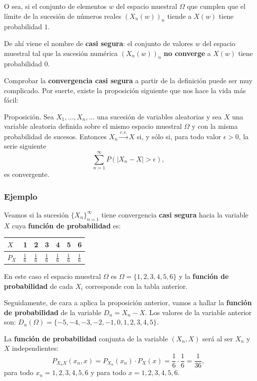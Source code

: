 \documentclass[]{book}
\begin{document}
O sea, si el conjunto de elementos \(w\) del espacio muestral \(\Omega\) que cumplen que el límite de la sucesión de números reales \((X_n(w))_n\) tiende a \(X(w)\) tiene probabilidad \(1\).

De ahí viene el nombre de \textbf{casi segura}: el conjunto de valores \(w\) del espacio muestral tal que la sucesión numérica \((X_n(w))_n\) \textbf{no converge} a \(X(w)\) tiene probabilidad 0.

Comprobar la \textbf{convergencia casi segura} a partir de la definición puede ser muy complicado. Por suerte, existe la proposición siguiente que nos hace la vida más fácil:

 Proposición.
Sea \(X_1,\ldots,X_n,\ldots\) una sucesión de variables aleatorias y sea \(X\) una variable aleatoria definida sobre el mismo espacio muestral \(\Omega\) y con la misma probabilidad de sucesos.
Entonces \(X_n\stackrel{c.s.}{\longrightarrow}X\) si, y sólo si, para todo valor \(\epsilon >0\), la serie siguiente
\[
\sum_{n=1}^\infty P(|X_n-X|>\epsilon),
\]
es convergente.

\hypertarget{ejemplo-2}{%
\subsubsection{Ejemplo}\label{ejemplo-2}}

Veamos si la sucesión \(\{X_n\}_{n=1}^\infty\) tiene convergencia \textbf{casi segura} hacia la variable \(X\) cuya \textbf{función de probabilidad} es:

\begin{longtable}[]{@{}lllllll@{}}
\toprule
\(X\) & 1 & 2 & 3 & 4 & 5 & 6\tabularnewline
\midrule
\endhead
\(P_X\) & \(\frac{1}{6}\) & \(\frac{1}{6}\) & \(\frac{1}{6}\) & \(\frac{1}{6}\) & \(\frac{1}{6}\) & \(\frac{1}{6}\)\tabularnewline
\bottomrule
\end{longtable}

En este caso el espacio muestral \(\Omega\) es \(\Omega=\{1,2,3,4,5,6\}\) y la \textbf{función de probabilidad} de cada \(X_i\) corresponde con la tabla anterior.

Seguidamente, de cara a aplica la proposición anterior, vamos a hallar la \textbf{función de probabilidad} de la variable \(D_n=X_n-X\).
Los valores de la variable anterior son: \(D_n(\Omega)=\{-5,-4,-3,-2,-1,0,1,2,3,4,5\}\).

La \textbf{función de probabilidad} conjunta de la variable \((X_n,X)\) será al ser \(X_n\) y \(X\) independientes:
\[
P_{X_nX}(x_n,x)=P_{X_n}(x_n)\cdot P_X(x)=\frac{1}{6}\cdot \frac{1}{6}=\frac{1}{36},
\]
para todo \(x_n=1,2,3,4,5,6\) y para todo \(x=1,2,3,4,5,6\).
\end{document}
